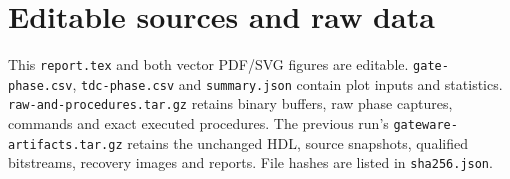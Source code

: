 \documentclass[11pt,a4paper]{article}
\begin{document}
\section*{Editable sources and raw data}
This \texttt{report.tex} and both vector PDF/SVG figures are editable.
\texttt{gate-phase.csv}, \texttt{tdc-phase.csv} and \texttt{summary.json} contain
plot inputs and statistics. \texttt{raw-and-procedures.tar.gz} retains binary
buffers, raw phase captures, commands and exact executed procedures.
The previous run's \texttt{gateware-artifacts.tar.gz} retains the unchanged HDL,
source snapshots, qualified bitstreams, recovery images and reports.
File hashes are listed in \texttt{sha256.json}.
\end{document}
